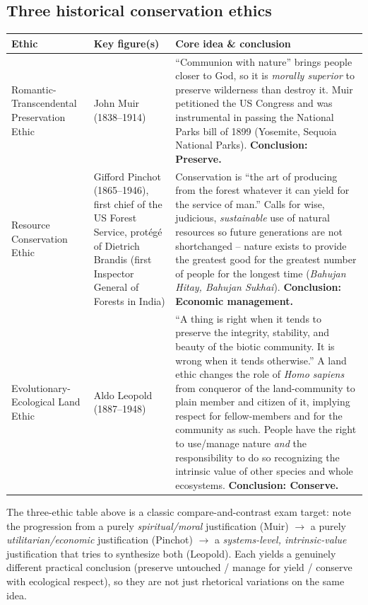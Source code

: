 \documentclass[11pt,a4paper]{article}
\begin{document}
\subsection{Three historical conservation ethics}
\begin{longtable}{@{}>{\raggedright\arraybackslash}p{3.1cm} >{\raggedright\arraybackslash}p{3.4cm} >{\raggedright\arraybackslash}p{8.2cm}@{}}
\toprule
\textbf{Ethic} & \textbf{Key figure(s)} & \textbf{Core idea \& conclusion} \\
\midrule
\endhead
Romantic-Transcendental Preservation Ethic & John Muir (1838--1914) & ``Communion with nature'' brings people closer to God, so it is \emph{morally superior} to preserve wilderness than destroy it. Muir petitioned the US Congress and was instrumental in passing the National Parks bill of 1899 (Yosemite, Sequoia National Parks). \textbf{Conclusion: Preserve.} \\[4pt]
Resource Conservation Ethic & Gifford Pinchot (1865--1946), first chief of the US Forest Service, prot\'eg\'e of Dietrich Brandis (first Inspector General of Forests in India) & Conservation is ``the art of producing from the forest whatever it can yield for the service of man.'' Calls for wise, judicious, \emph{sustainable} use of natural resources so future generations are not shortchanged -- nature exists to provide the greatest good for the greatest number of people for the longest time (\emph{Bahujan Hitay, Bahujan Sukhai}). \textbf{Conclusion: Economic management.} \\[4pt]
Evolutionary-Ecological Land Ethic & Aldo Leopold (1887--1948) & ``A thing is right when it tends to preserve the integrity, stability, and beauty of the biotic community. It is wrong when it tends otherwise.'' A land ethic changes the role of \emph{Homo sapiens} from conqueror of the land-community to plain member and citizen of it, implying respect for fellow-members and for the community as such. People have the right to use/manage nature \emph{and} the responsibility to do so recognizing the intrinsic value of other species and whole ecosystems. \textbf{Conclusion: Conserve.} \\
\bottomrule
\end{longtable}

\begin{exambox}
The three-ethic table above is a classic compare-and-contrast exam target: note the progression from a purely \emph{spiritual/moral} justification (Muir) $\to$ a purely \emph{utilitarian/economic} justification (Pinchot) $\to$ a \emph{systems-level, intrinsic-value} justification that tries to synthesize both (Leopold). Each yields a genuinely different practical conclusion (preserve untouched / manage for yield / conserve with ecological respect), so they are not just rhetorical variations on the same idea.
\end{exambox}
\end{document}
